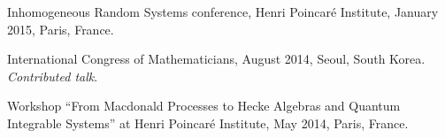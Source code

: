 \documentclass[letterpaper,11pt]{article}
\begin{document}
\begin{etaremune}







\item Inhomogeneous Random Systems conference, Henri Poincar\'e Institute, January 2015, Paris, France.




\item International Congress of Mathematicians, August 2014, 
Seoul, South Korea. \emph{Contributed talk}.


\item Workshop 
``From Macdonald Processes to Hecke Algebras and Quantum Integrable Systems''
at Henri Poincar\'e Institute,
May 2014, Paris, France.


\end{etaremune}
\end{document}
